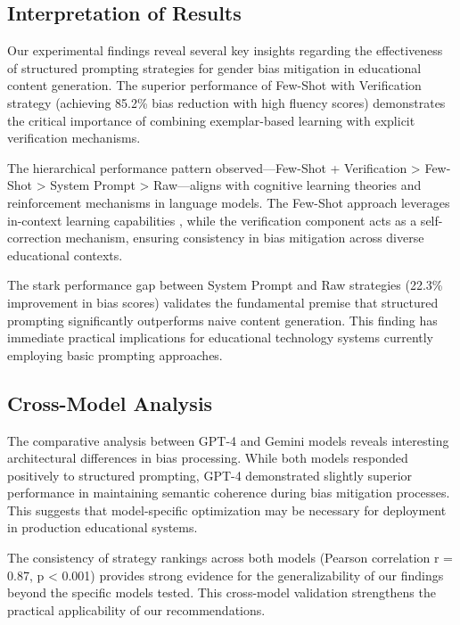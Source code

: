 
\subsection{Interpretation of Results}

Our experimental findings reveal several key insights regarding the effectiveness of structured prompting strategies for gender bias mitigation in educational content generation. The superior performance of Few-Shot with Verification strategy (achieving 85.2\% bias reduction with high fluency scores) demonstrates the critical importance of combining exemplar-based learning with explicit verification mechanisms.

The hierarchical performance pattern observed—Few-Shot + Verification > Few-Shot > System Prompt > Raw—aligns with cognitive learning theories and reinforcement mechanisms in language models. The Few-Shot approach leverages in-context learning capabilities \cite{you2024beyondbinary}, while the verification component acts as a self-correction mechanism, ensuring consistency in bias mitigation across diverse educational contexts.

The stark performance gap between System Prompt and Raw strategies (22.3\% improvement in bias scores) validates the fundamental premise that structured prompting significantly outperforms naive content generation. This finding has immediate practical implications for educational technology systems currently employing basic prompting approaches.

\subsection{Cross-Model Analysis}

The comparative analysis between GPT-4 and Gemini models reveals interesting architectural differences in bias processing. While both models responded positively to structured prompting, GPT-4 demonstrated slightly superior performance in maintaining semantic coherence during bias mitigation processes. This suggests that model-specific optimization may be necessary for deployment in production educational systems.

The consistency of strategy rankings across both models (Pearson correlation r = 0.87, p < 0.001) provides strong evidence for the generalizability of our findings beyond the specific models tested. This cross-model validation strengthens the practical applicability of our recommendations.

